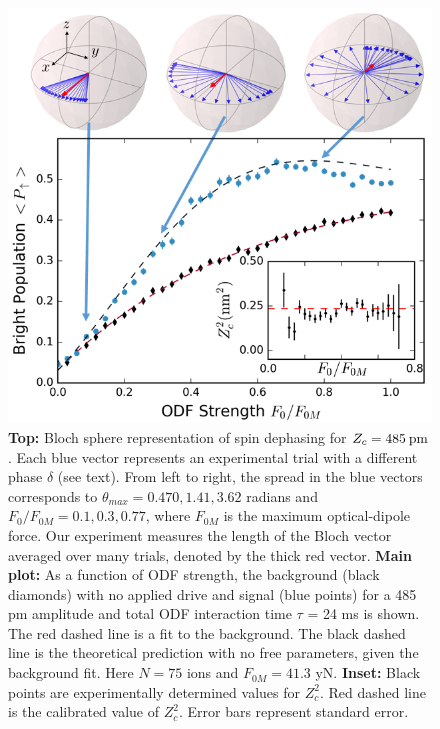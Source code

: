 \documentclass[aps,prl,twocolumn,superscriptaddress,floatfix]{revtex4-1}
\begin{document}
\begin{figure}
    \centering
    \includegraphics[width=\columnwidth]{odf_strength_bloch}
  \caption{\textbf{Top:} Bloch sphere representation \citep{QuTip} of spin dephasing for $Z_{c} = 485\: \rm{pm}$. Each blue vector represents an experimental trial with a different phase $\delta$ (see text). From left to right, the spread in the blue vectors corresponds to $\theta_{max} = 0.470, 1.41, 3.62$ radians and $F_{0}/F_{0M} = 0.1,0.3,0.77$, where $F_{0M}$ is the maximum optical-dipole force. Our experiment measures the length of the Bloch vector averaged over many trials, denoted by the thick red vector. \textbf{Main plot:} As a function of ODF strength, the background (black diamonds) with no applied drive and signal (blue points) for a 485 pm amplitude and total ODF interaction time $\tau$ = 24 ms is shown. The red dashed line is a fit to the background. The black dashed line is the theoretical prediction with no free parameters, given the background fit. Here $N = 75$ ions and $F_{0M} = 41.3$ yN. \textbf{Inset:} Black points are experimentally determined values for $Z_{c}^2$. Red dashed line is the calibrated value of $Z_{c}^{2}$. Error bars represent standard error.}\label{Meas_stren}
\end{figure}
\end{document}
